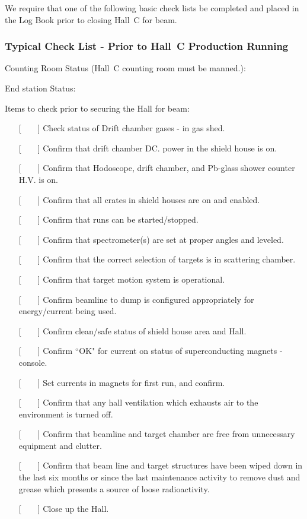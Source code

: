 We require that one of the following basic check lists be
completed and placed in the Log Book prior to closing Hall~C for beam.

\newpage
\subsubsection{Typical Check List - Prior to Hall~C Production Running}

\noindent Counting Room Status (Hall~C counting room must be manned.):
\vspace{\baselineskip}

\noindent End station Status:
\vspace{\baselineskip}

\noindent Items to check prior to securing the Hall for beam:

\begin{itemize}
\item[{[~~~~]}] Check status of Drift chamber gases - in gas shed.
\item[{[~~~~]}] Confirm that drift chamber DC. power in the shield house is on.
\item[{[~~~~]}] Confirm that Hodoscope, drift chamber, and Pb-glass shower counter 
H.V.
is on.
\item[{[~~~~]}] Confirm that all crates in shield houses are on and enabled.
\item[{[~~~~]}] Confirm that runs can be started/stopped.
\item[{[~~~~]}] Confirm that spectrometer(s) are set at proper angles and leveled.
\item[{[~~~~]}] Confirm that the correct selection of targets is in scattering chamber.
\item[{[~~~~]}] Confirm that target motion system is operational.
\item[{[~~~~]}] Confirm beamline to dump is configured appropriately for 
energy/current
being used.
\item[{[~~~~]}] Confirm clean/safe status of shield house area and Hall.
\item[{[~~~~]}] Confirm ``OK" for current on status of superconducting magnets - 
console.
\item[{[~~~~]}] Set currents in magnets for first run, and confirm.

\item[{[~~~~]}] Confirm that any hall ventilation which exhausts air to the environment is turned off.
\item[{[~~~~]}] Confirm that beamline and target chamber are free from unnecessary equipment and clutter.
\item[{[~~~~]}] Confirm that beam line and target structures have been wiped down in the last six months or since the last maintenance activity to remove dust and grease which presents a source of loose radioactivity.

\item[{[~~~~]}] Close up the Hall.
\end{itemize}
